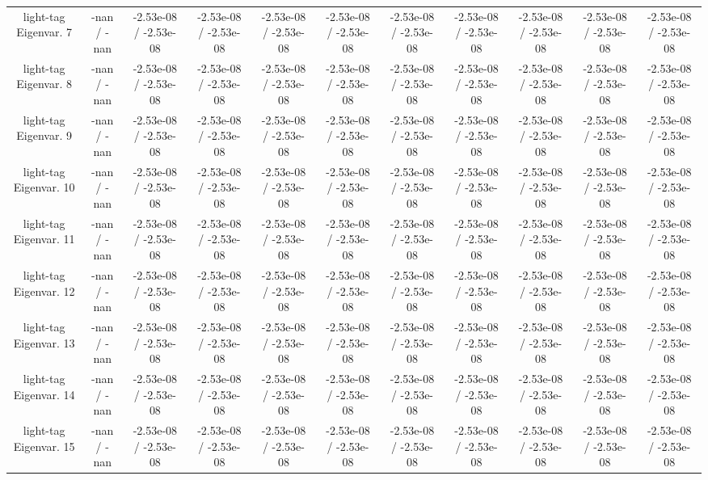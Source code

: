 \begin{table}[htbp]
\begin{center}
\begin{tabular}{|c|c|c|c|c|c|c|c|c|c|c|}
  light-tag Eigenvar. 7 & -nan / -nan & -2.53e-08 / -2.53e-08 & -2.53e-08 / -2.53e-08 & -2.53e-08 / -2.53e-08 & -2.53e-08 / -2.53e-08 & -2.53e-08 / -2.53e-08 & -2.53e-08 / -2.53e-08 & -2.53e-08 / -2.53e-08 & -2.53e-08 / -2.53e-08 & -2.53e-08 / -2.53e-08 \\ 
  light-tag Eigenvar. 8 & -nan / -nan & -2.53e-08 / -2.53e-08 & -2.53e-08 / -2.53e-08 & -2.53e-08 / -2.53e-08 & -2.53e-08 / -2.53e-08 & -2.53e-08 / -2.53e-08 & -2.53e-08 / -2.53e-08 & -2.53e-08 / -2.53e-08 & -2.53e-08 / -2.53e-08 & -2.53e-08 / -2.53e-08 \\ 
  light-tag Eigenvar. 9 & -nan / -nan & -2.53e-08 / -2.53e-08 & -2.53e-08 / -2.53e-08 & -2.53e-08 / -2.53e-08 & -2.53e-08 / -2.53e-08 & -2.53e-08 / -2.53e-08 & -2.53e-08 / -2.53e-08 & -2.53e-08 / -2.53e-08 & -2.53e-08 / -2.53e-08 & -2.53e-08 / -2.53e-08 \\ 
  light-tag Eigenvar. 10 & -nan / -nan & -2.53e-08 / -2.53e-08 & -2.53e-08 / -2.53e-08 & -2.53e-08 / -2.53e-08 & -2.53e-08 / -2.53e-08 & -2.53e-08 / -2.53e-08 & -2.53e-08 / -2.53e-08 & -2.53e-08 / -2.53e-08 & -2.53e-08 / -2.53e-08 & -2.53e-08 / -2.53e-08 \\ 
  light-tag Eigenvar. 11 & -nan / -nan & -2.53e-08 / -2.53e-08 & -2.53e-08 / -2.53e-08 & -2.53e-08 / -2.53e-08 & -2.53e-08 / -2.53e-08 & -2.53e-08 / -2.53e-08 & -2.53e-08 / -2.53e-08 & -2.53e-08 / -2.53e-08 & -2.53e-08 / -2.53e-08 & -2.53e-08 / -2.53e-08 \\ 
  light-tag Eigenvar. 12 & -nan / -nan & -2.53e-08 / -2.53e-08 & -2.53e-08 / -2.53e-08 & -2.53e-08 / -2.53e-08 & -2.53e-08 / -2.53e-08 & -2.53e-08 / -2.53e-08 & -2.53e-08 / -2.53e-08 & -2.53e-08 / -2.53e-08 & -2.53e-08 / -2.53e-08 & -2.53e-08 / -2.53e-08 \\ 
  light-tag Eigenvar. 13 & -nan / -nan & -2.53e-08 / -2.53e-08 & -2.53e-08 / -2.53e-08 & -2.53e-08 / -2.53e-08 & -2.53e-08 / -2.53e-08 & -2.53e-08 / -2.53e-08 & -2.53e-08 / -2.53e-08 & -2.53e-08 / -2.53e-08 & -2.53e-08 / -2.53e-08 & -2.53e-08 / -2.53e-08 \\ 
  light-tag Eigenvar. 14 & -nan / -nan & -2.53e-08 / -2.53e-08 & -2.53e-08 / -2.53e-08 & -2.53e-08 / -2.53e-08 & -2.53e-08 / -2.53e-08 & -2.53e-08 / -2.53e-08 & -2.53e-08 / -2.53e-08 & -2.53e-08 / -2.53e-08 & -2.53e-08 / -2.53e-08 & -2.53e-08 / -2.53e-08 \\ 
  light-tag Eigenvar. 15 & -nan / -nan & -2.53e-08 / -2.53e-08 & -2.53e-08 / -2.53e-08 & -2.53e-08 / -2.53e-08 & -2.53e-08 / -2.53e-08 & -2.53e-08 / -2.53e-08 & -2.53e-08 / -2.53e-08 & -2.53e-08 / -2.53e-08 & -2.53e-08 / -2.53e-08 & -2.53e-08 / -2.53e-08 \\ 

\end{tabular}
\end{center}
\end{table}
